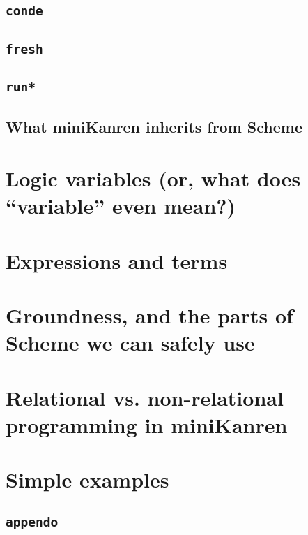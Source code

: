 \documentclass{book}
\begin{document}
\subsection{\texttt{conde}}

\subsection{\texttt{fresh}}

\subsection{\texttt{run*}}

\subsection{What miniKanren inherits from Scheme}

\section{Logic variables (or, what does ``variable'' even mean?)}


\section{Expressions and terms}

\section{Groundness, and the parts of Scheme we can safely use}

\section{Relational vs. non-relational programming in miniKanren}

\section{Simple examples}

\subsection{\texttt{appendo}}
\end{document}
